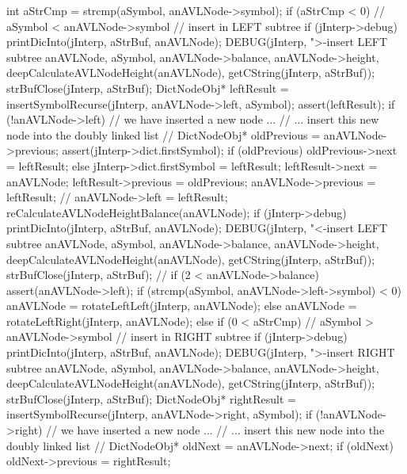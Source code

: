 {  int aStrCmp = strcmp(aSymbol, anAVLNode->symbol);
  if (aStrCmp < 0) {
    // aSymbol < anAVLNode->symbol // insert in LEFT subtree
    if (jInterp->debug) {
      printDicInto(jInterp, aStrBuf, anAVLNode);
      DEBUG(jInterp, ">-insert LEFT subtree %
            anAVLNode, aSymbol, anAVLNode->balance,
            anAVLNode->height, deepCalculateAVLNodeHeight(anAVLNode),
            getCString(jInterp, aStrBuf));
      strBufClose(jInterp, aStrBuf);
    }
    DictNodeObj* leftResult =
      insertSymbolRecurse(jInterp, anAVLNode->left, aSymbol);
    assert(leftResult);
    if (!anAVLNode->left) {
      // we have inserted a new node ...
      // ... insert this new node into the doubly linked list
      //
      DictNodeObj* oldPrevious               = anAVLNode->previous;
      assert(jInterp->dict.firstSymbol);
      if (oldPrevious) oldPrevious->next = leftResult;
      else jInterp->dict.firstSymbol     = leftResult;
      leftResult->next                   = anAVLNode;
      leftResult->previous               = oldPrevious;
      anAVLNode->previous                = leftResult;
      //
    }
    anAVLNode->left = leftResult;
    reCalculateAVLNodeHeightBalance(anAVLNode);
    if (jInterp->debug) {
      printDicInto(jInterp, aStrBuf, anAVLNode);
      DEBUG(jInterp, "<-insert LEFT subtree %
          anAVLNode, aSymbol, anAVLNode->balance,
          anAVLNode->height, deepCalculateAVLNodeHeight(anAVLNode),
          getCString(jInterp, aStrBuf));
      strBufClose(jInterp, aStrBuf);
    }
    //
    if (2 < anAVLNode->balance) {
      assert(anAVLNode->left);
      if (strcmp(aSymbol, anAVLNode->left->symbol) < 0) {
        anAVLNode = rotateLeftLeft(jInterp, anAVLNode);
      } else {
        anAVLNode = rotateLeftRight(jInterp, anAVLNode);
      }
    }
  } else if (0 < aStrCmp) {
    // aSymbol > anAVLNode->symbol // insert in RIGHT subtree
    if (jInterp->debug) {
      printDicInto(jInterp, aStrBuf, anAVLNode);
      DEBUG(jInterp, ">-insert RIGHT subtree %
          anAVLNode, aSymbol, anAVLNode->balance,
          anAVLNode->height, deepCalculateAVLNodeHeight(anAVLNode),
          getCString(jInterp, aStrBuf));
      strBufClose(jInterp, aStrBuf);
    }
    DictNodeObj* rightResult =
      insertSymbolRecurse(jInterp, anAVLNode->right, aSymbol);
    if (!anAVLNode->right) {
      // we have inserted a new node ...
      // ... insert this new node into the doubly linked list
      //
      DictNodeObj* oldNext               = anAVLNode->next;
      if (oldNext) oldNext->previous = rightResult;
}}}
